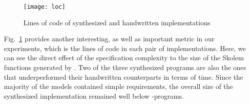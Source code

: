 \begin{figure}[]
	\centering
	\texttt{[image: loc]}    	
	\caption{Lines of code of synthesized and handwritten implementations}
	\label{fg:loc}
\end{figure}

Fig.~\ref{fg:loc} provides another interesting, as well as important metric in
our experiments, which is the lines of code in each pair of implementations.
Here, we can see the direct effect of the specification complexity to the size
of the Skolem functions generated by \aeval. Two of the three synthesized
programs are also the ones that underperformed their handwritten counterparts in
terms of time. Since the majority of the models contained simple
requirements, the overall size of the synthesized implementation remained well below \lustrev-programs.
%


